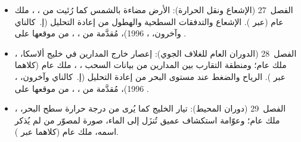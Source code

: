 \begin{itemize}
  \item الفصل~27 (الإشعاع ونقل الحرارة): الأرض مضاءة بالشمس كما رُئيت من ، ، ملك عام (عبر ). الإشعاع والتدفقات السطحية والهطول من إعادة التحليل  (إ.~كالناي وآخرون، ، 1996)، مُقدَّمة من ، ، من موقعها على .
  \item الفصل~28 (الدوران العام للغلاف الجوي): إعصار خارج المدارين في خليج ألاسكا، ، ملك عام؛ ومنطقة التقارب بين المدارين من بيانات السحب ، ، ملك عام (كلاهما عبر ). الرياح والضغط عند مستوى البحر من إعادة التحليل  (إ.~كالناي وآخرون، ، 1996)، مُقدَّمة من ، ، من موقعها على .
  \item الفصل~29 (دوران المحيط): تيار الخليج كما يُرى من درجة حرارة سطح البحر، ، ملك عام؛ وعوّامة استكشاف عميق تُنزَل إلى الماء، صورة لمصوّر من  لم يُذكر اسمه، ملك عام (كلاهما عبر ).
\end{itemize}
